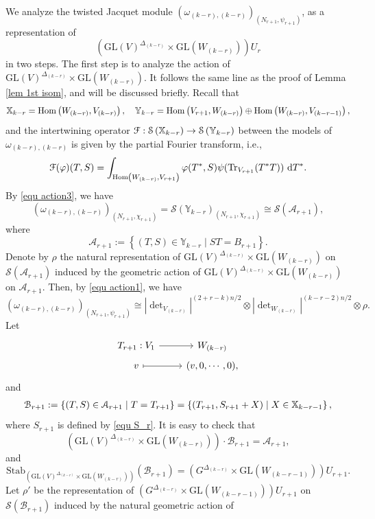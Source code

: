 \documentclass[11pt,reqno]{amsart}
\renewcommand{\1}{{\mathbf{1}}} \newcommand{\sB}{{\mathscr{B}}}
\newcommand{\BY}{{\mathbb {Y}}} \newcommand{\BZ}{{\mathbb {Z}}}
\newcommand{\CA}{{\mathcal {A}}} \newcommand{\CB}{{\mathcal {B}}}
\newcommand{\CS}{{\mathcal {S}}} \newcommand{\CT}{{\mathcal {T}}}
\newcommand{\GL}{{\mathrm{GL}}}\newcommand{\G}{{\mathrm{G}}}
\newcommand{\Stab}{{\mathrm{Stab}}}\newcommand{\Symb}{{\mathrm{Symb}}}
\newcommand{\Tr}{{\mathrm{Tr}}}
\newcommand{\ra}{\rightarrow} \newcommand{\imp}{\Longrightarrow}
\theoremstyle{plain}
\theoremstyle{definition}
\numberwithin{equation}{section}
\begin{document}
We analyze the twisted Jacquet module $\left(\omega_{(k-r),(k-r)}\right)_{(N_{r+1},\psi_{r+1})}$, as a representation of $$\left(\GL(V)^{\Delta_{(k-r)}}\times\GL(W_{(k-r)})\right)U_r$$ in two steps. 
 The first step is to analyze the action of $\GL(V)^{\Delta_{(k-r)}}\times\GL(W_{(k-r)})$. It follows the same line as the proof of Lemma \ref{lem 1st isom}, and will be discussed briefly.  
Recall that
$$\BX_{k-r}=\Hom\left(W_{(k-r)},V_{(k-r)}\right),\quad \BY_{k-r}=\Hom\left(V_{r+1},W_{(k-r)}\right)\oplus\Hom\left(W_{(k-r)},V_{(k-r-1)}\right),$$ and the intertwining operator $\CF:\CS\left(\BX_{k-r}\right)\ra \CS\left(\BY_{k-r}\right)$ between the models of $\omega_{(k-r),(k-r)}$ is given by the partial Fourier transform, i.e.,
$$\CF(\varphi)(T,S)=\int_{\Hom\left(W_{(k-r)},V_{r+1}\right)}\varphi(T^*,S)\psi(\Tr_{V_{r+1}}(T^*T))\ \d T^*.$$ 
By \eqref{equ action3}, we have
$$\left(\omega_{(k-r),(k-r)}\right)_{\left(N_{r+1},\chi_{r+1}\right)}=\CS(\BY_{k-r})_{(N_{r+1},\chi_{r+1})}\cong\CS(\CA_{r+1}),$$  where $$\CA_{r+1}:=\left\{(T,S)\in\BY_{k-r}\mid ST=B_{r+1}\right\}.$$
Denote by $\rho$ the natural representation of $\GL(V)^{\Delta_{(k-r)}}\times\GL(W_{(k-r)})$ on $\CS(\CA_{r+1})$ induced by the geometric action of 
$\GL(V)^{\Delta_{(k-r)}}\times\GL(W_{(k-r)})$ on $\CA_{r+1}$. Then, by \eqref{equ action1}, we have
\begin{equation}\label{equ isom-pf1'}\left(\omega_{(k-r),(k-r)}\right)_{\left(N_{r+1},\psi_{r+1}\right)}\cong|\det\nolimits_{V_{(k-r)}}|^{(2+r-k)n/2}\otimes|\det\nolimits_{W_{(k-r)}}|^{(k-r-2)n/2}\otimes\rho.\end{equation}
Let
$$\begin{tikzcd}[row sep=0.1cm]
	T_{r+1}: V_{1} & W_{(k-r)}\\
	v & (v,0,\cdots,0),
	\arrow[ from=1-1, to=1-2]
	\arrow[maps to, from=2-1, to=2-2]
\end{tikzcd}$$
and $$\begin{aligned}\CB_{r+1}:=\left\{(T,S)\in\CA_{r+1}\mid T=T_{r+1}\right\}
=\left\{(T_{r+1},S_{r+1}+X)\mid X\in \BX_{k-r-1}\right\},\end{aligned}$$ where $S_{r+1}$ is defined by \eqref{equ S_r}. It is easy to check that
$$\left(\GL(V)^{\Delta_{(k-r)}}\times\GL(W_{(k-r)})\right)\cdot\CB_{r+1}=\CA_{r+1},$$ and
$$\Stab_{\left(\GL(V)^{\Delta_{(k-r)}}\times\GL(W_{(k-r)})\right)}(\CB_{r+1})=\left(G^{\Delta_{(k-r)}}\times\GL(W_{(k-r-1)})\right)U_{r+1}.$$
Let $\rho'$ be the representation of $\left(G^{\Delta_{(k-r)}}\times\GL(W_{(k-r-1)})\right)U_{r+1}$ on  
$\CS(\CB_{r+1})$ induced by the natural geometric action of
\end{document}
